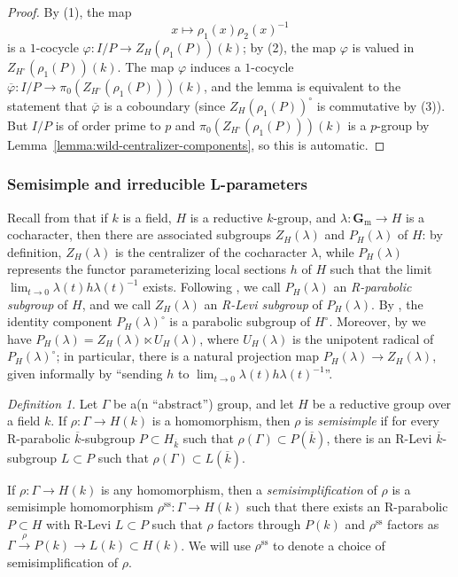 \documentclass[reqno]{amsart}
\numberwithin{equation}{subsection}
\newcommand{\G}{\mathbf{G}}
\newcommand{\ol}[1]{\overline{#1}}
\newcommand{\co}{\colon}
\theoremstyle{remark}
\newtheorem{defn}[thm]{Definition}
\numberwithin{equation}{subsection}
\numberwithin{figure}{subsection}
\begin{document}
\begin{proof}
By (1), the map
\[
x \mapsto \rho_1(x)\rho_2(x)^{-1}
\]
is a $1$-cocycle $\varphi\co I/P \to Z_H(\rho_1(P))(k)$; by (2), the map $\varphi$ is valued in $Z_{H^\circ}(\rho_1(P))(k)$. The map $\varphi$ induces a $1$-cocycle $\ol\varphi\co I/P \to \pi_0(Z_{H^\circ}(\rho_1(P)))(k)$, and the lemma is equivalent to the statement that $\ol\varphi$ is a coboundary (since $Z_H(\rho_1(P))^\circ$ is commutative by (3)). But $I/P$ is of order prime to $p$ and $\pi_0(Z_{H^\circ}(\rho_1(P)))(k)$ is a $p$-group by Lemma~\ref{lemma:wild-centralizer-components}, so this is automatic.
\end{proof}



\subsubsection{Semisimple and irreducible L-parameters}

Recall from \cite[Lemma 2.1.4 and the following paragraph]{CGP15} that if $k$ is a field, $H$ is a reductive $k$-group, and $\lambda\colon \G_{\mathrm{m}} \to H$ is a cocharacter, then there are associated subgroups $Z_H(\lambda)$ and $P_H(\lambda)$ of $H$: by definition, $Z_H(\lambda)$ is the centralizer of the cocharacter $\lambda$, while $P_H(\lambda)$ represents the functor parameterizing local sections $h$ of $H$ such that the limit $\lim_{t \to 0} \lambda(t)h\lambda(t)^{-1}$ exists. Following \cite[\S 6]{BMR05}, we call $P_H(\lambda)$ an \textit{R-parabolic subgroup} of $H$, and we call $Z_H(\lambda)$ an \textit{R-Levi subgroup} of $P_H(\lambda)$. By \cite[Proposition 2.2.9]{CGP15}, the identity component $P_H(\lambda)^\circ$ is a parabolic subgroup of $H^\circ$. Moreover, by \cite[Proposition 2.1.8]{CGP15} we have $P_H(\lambda) = Z_H(\lambda) \ltimes U_H(\lambda)$, where $U_H(\lambda)$ is the unipotent radical of $P_H(\lambda)^\circ$; in particular, there is a natural projection map $P_H(\lambda) \to Z_H(\lambda)$, given informally by ``sending $h$ to $\lim_{t \to 0} \lambda(t)h\lambda(t)^{-1}$''.

\begin{defn}
Let $\Gamma$ be a(n ``abstract'') group, and let $H$ be a reductive group over a field $k$. If $\rho \co \Gamma \to H(k)$ is a homomorphism, then $\rho$ is \textit{semisimple} if for every R-parabolic $\ol{k}$-subgroup $P \subset H_{\ol k}$ such that $\rho(\Gamma) \subset P(\ol k)$, there is an R-Levi $\ol k$-subgroup $L \subset P$ such that $\rho(\Gamma) \subset L(\ol k)$.

If $\rho\colon \Gamma \to H(k)$ is any homomorphism, then a \textit{semisimplification} of $\rho$ is a semisimple homomorphism $\rho^{\mathrm{ss}}\colon \Gamma \to H(k)$ such that there exists an R-parabolic $P \subset H$ with R-Levi $L \subset P$ such that $\rho$ factors through $P(k)$ and $\rho^{\mathrm{ss}}$ factors as $\Gamma \xrightarrow{\rho} P(k) \to L(k) \subset H(k)$. We will use $\rho^{\mathrm{ss}}$ to denote a choice of semisimplification of $\rho$.
\end{defn}
\end{document}
